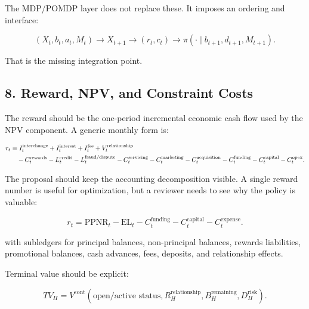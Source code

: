 \documentclass[
]{article}
\newcommand{\PPNR}{\mathrm{PPNR}}
\newcommand{\EL}{\mathrm{EL}}
\begin{document}
The MDP/POMDP layer does not replace these. It imposes an ordering and
interface:

\begin{equation}
  (X_t,b_t,a_t,M_t)
  \longrightarrow
  X_{t+1}
  \longrightarrow
  (r_t,c_t)
  \longrightarrow
  \pi(\cdot\mid b_{t+1},d_{t+1},M_{t+1}).
  \label{eq:simulation-ordering}
\end{equation}

That is the missing integration point.

\hypertarget{reward-npv-and-constraint-costs}{%
\subsection{8. Reward, NPV, and Constraint
Costs}\label{reward-npv-and-constraint-costs}}

The reward should be the one-period incremental economic cash flow used
by the NPV component. A generic monthly form is:

\begin{align}
  r_t
  &=
    I_t^{\mathrm{interchange}}
  + I_t^{\mathrm{interest}}
  + I_t^{\mathrm{fee}}
  + V_t^{\mathrm{relationship}}
  \notag\\
  &\quad
  - C_t^{\mathrm{rewards}}
  - L_t^{\mathrm{credit}}
  - L_t^{\mathrm{fraud/dispute}}
  - C_t^{\mathrm{servicing}}
  - C_t^{\mathrm{marketing}}
  - C_t^{\mathrm{acquisition}}
  - C_t^{\mathrm{funding}}
  - C_t^{\mathrm{capital}}
  - C_t^{\mathrm{opex}} .
  \label{eq:reward-expanded}
\end{align}

The proposal should keep the accounting decomposition visible. A single
reward number is useful for optimization, but a reviewer needs to see
why the policy is valuable:

\begin{equation}
  r_t
  =
  \PPNR_t
  - \EL_t
  - C_t^{\mathrm{funding}}
  - C_t^{\mathrm{capital}}
  - C_t^{\mathrm{expense}}.
  \label{eq:reward-compact}
\end{equation}

with subledgers for principal balances, non-principal balances, rewards
liabilities, promotional balances, cash advances, fees, deposits, and
relationship effects.

Terminal value should be explicit:

\begin{equation}
  TV_H
  =
  V^{\mathrm{cont}}\!\left(
    \text{open/active status},
    R_H^{\mathrm{relationship}},
    B_H^{\mathrm{remaining}},
    D_H^{\mathrm{risk}}
  \right).
  \label{eq:terminal-value}
\end{equation}
\end{document}
